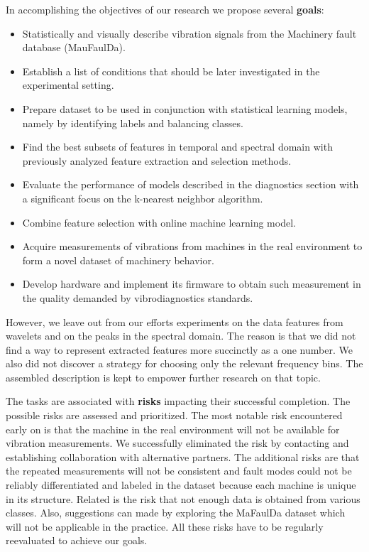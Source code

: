 \noindent In accomplishing the objectives of our research we propose several \textbf{goals}:
\begin{itemize}
    \itemsep0pt
	\item Statistically and visually describe vibration signals from the Machinery fault database (MauFaulDa).
	\item Establish a list of conditions that should be later investigated in the experimental setting.
	\item Prepare dataset to be used in conjunction with statistical learning models, namely by identifying labels and balancing classes.
	\item Find the best subsets of features in temporal and spectral domain with previously analyzed feature extraction and selection methods.
	\item Evaluate the performance of models described in the diagnostics section with a significant focus on the k-nearest neighbor algorithm.
	\item Combine feature selection with online machine learning model.
	\item Acquire measurements of vibrations from machines in the real environment to form a novel dataset of machinery behavior.
	\item Develop hardware and implement its firmware to obtain such measurement in the quality demanded by vibrodiagnostics standards.
\end{itemize}

However, we leave out from our efforts experiments on the data features from wavelets and on the peaks in the spectral domain. The reason is that we did not find a way to represent extracted features more succinctly as a one number. We also did not discover a strategy for choosing only the relevant frequency bins. The assembled description is kept to empower further research on that topic.

The tasks are associated with \textbf{risks} impacting their successful completion. The possible risks are assessed and prioritized. The most notable risk encountered early on is that the machine in the real environment will not be available for vibration measurements. We successfully eliminated the risk by contacting and establishing collaboration with alternative partners. The additional risks are that the repeated measurements will not be consistent and fault modes could not be reliably differentiated and labeled in the dataset because each machine is unique in its structure. Related is the risk that not enough data is obtained from various classes.  Also, suggestions can made by exploring the MaFaulDa dataset which will not be applicable in the practice. All these risks have to be regularly reevaluated to achieve our goals.


